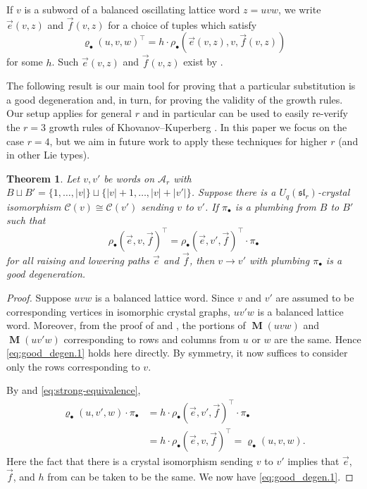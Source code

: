 \documentclass{amsart}
\newtheorem{theorem}{Theorem}[section]
\theoremstyle{definition}
\theoremstyle{remark}
\numberwithin{equation}{section}
\DeclareMathOperator{\PM}{\mathbf{M}}
\newcommand{\fsl}{\mathfrak{sl}}
\begin{document}
If $v$ is a subword of a balanced oscillating lattice word $z=uvw$, we write $\vec{e}(v,z)$ and $\vec{f}(v,z)$ for a choice of tuples which satisfy 
\[
\varrho_\bullet(u,v,w)^{\top}=h \cdot \rho_\bullet(\vec{e}(v,z),v,\vec{f}(v,z))
\]
for some $h$. Such $\vec{e}(v,z)$ and $\vec{f}(v,z)$ exist by .

The following result is our main tool for proving that a particular substitution is a good degeneration and, in turn, for proving the validity of the growth rules. Our setup applies for general $r$ and in particular can be used to easily re-verify the $r=3$ growth rules of Khovanov--Kuperberg \cite{Khovanov-Kuperberg}. In this paper we focus on the case $r=4$, but we aim in future work to apply these techniques for higher $r$ (and in other Lie types).

\begin{theorem}\label{thm:good_degen}
  Let $v, v'$ be words on $\mathcal{A}_r$ with $B \sqcup B' =\{1,\ldots,|v|\} \sqcup \{|v|+1,\ldots,|v|+|v'|\}$. Suppose there is a $U_q(\fsl_r)$-crystal isomorphism $\mathcal{C}(v) \cong \mathcal{C}(v')$ sending $v$ to $v'$. If $\pi_\bullet$ is a plumbing from $B$ to $B'$ such that
  \begin{equation}\label{eq:strong-equivalence}
    \rho_\bullet(\vec{e}, v, \vec{f})^\top = \rho_\bullet(\vec{e}, v', \vec{f})^\top \cdot \pi_\bullet
  \end{equation}
  for all raising and lowering paths $\vec{e}$ and $\vec{f}$, then $v \to v'$ with plumbing $\pi_\bullet$ is a good degeneration.
\end{theorem}

\begin{proof}
  Suppose $uvw$ is a balanced lattice word. Since $v$ and $v'$ are assumed to be corresponding vertices in isomorphic crystal graphs, $uv'w$ is a balanced lattice word. Moreover, from the proof of  and , the portions of $\PM(uvw)$ and $\PM(uv'w)$ corresponding to rows and columns from $u$ or $w$ are the same. Hence \eqref{eq:good_degen.1} holds here directly. By symmetry, it now suffices to consider only the rows corresponding to $v$.

   By  and \eqref{eq:strong-equivalence},
  \begin{align*}
     \varrho_\bullet(u, v', w) \cdot \pi_\bullet &= h \cdot \rho_\bullet(\vec{e}, v', \vec{f})^\top \cdot \pi_\bullet \\
      &= h \cdot \rho_\bullet(\vec{e}, v, \vec{f})^\top = \varrho_\bullet(u, v, w) .
  \end{align*}
  Here the fact that there is a crystal isomorphism sending $v$ to $v'$ implies that $\vec{e}$, $\vec{f}$, and $h$ from  can be taken to be the same. We now have \eqref{eq:good_degen.1}. 
\end{proof}
\end{document}
